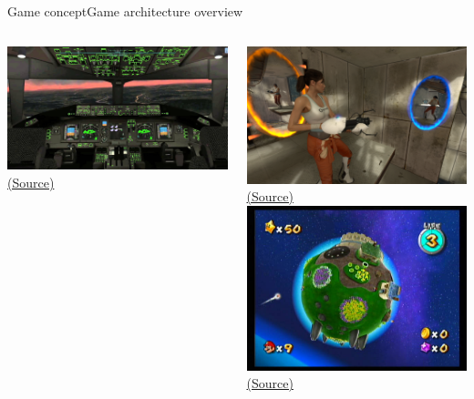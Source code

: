 \documentclass[10pt,compress]{beamer} %
\begin{document}
\begin{frame}{Game concept}{Game architecture overview}
\begin{columns}
		\centering \includegraphics[width=0.8\linewidth]{figs/xplane}\\
		\tiny \href{https://www.youtube.com/watch?v=JrIu9rkAcyQ}{(Source)}
	   \tiny
	   \begin{center}
	    \vspace{-0.2cm}
		\includegraphics[width=0.8\linewidth]{figs/portals}\\
		\href{http://iagames.es/portal-survive-corto-de-accion-del-prestigioso-videojuego/}{(Source)}\\
		\includegraphics[width=0.8\linewidth]{figs/mariogalaxy}\\
		\href{https://s-media-cache-ak0.pinimg.com/originals/8c/f4/29/8cf429601578a742de966e985199e89e.jpg}{(Source)}
		\end{center}
	\end{columns}
\end{frame}
\end{document}

